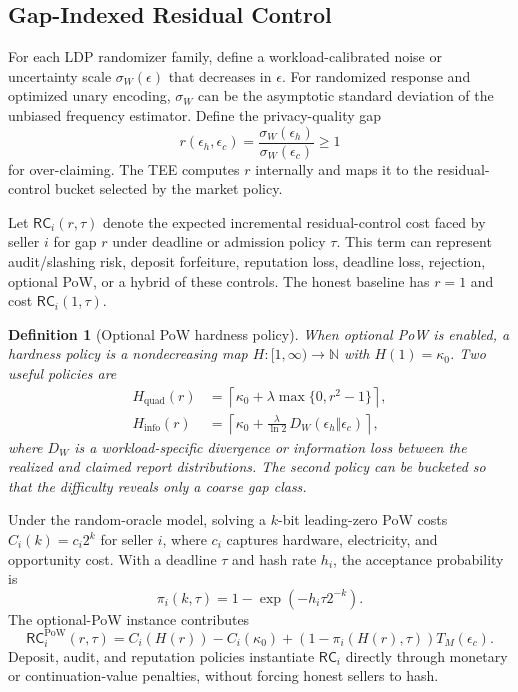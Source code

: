 \documentclass[conference]{IEEEtran}
\newtheorem{definition}{Definition}[section]
\newcommand{\eps}{\epsilon}
\newcommand{\pow}{\mathrm{PoW}}
\begin{document}
\subsection{Gap-Indexed Residual Control}

For each LDP randomizer family, define a workload-calibrated noise or uncertainty scale $\sigma_W(\eps)$ that decreases in $\eps$. For randomized response and optimized unary encoding, $\sigma_W$ can be the asymptotic standard deviation of the unbiased frequency estimator. Define the privacy-quality gap
\[
r(\eps_h,\eps_c)=\frac{\sigma_W(\eps_h)}{\sigma_W(\eps_c)}\ge 1
\]
for over-claiming. The TEE computes $r$ internally and maps it to the residual-control bucket selected by the market policy.

Let $\mathsf{RC}_i(r,\tau)$ denote the expected incremental residual-control cost faced by seller $i$ for gap $r$ under deadline or admission policy $\tau$. This term can represent audit/slashing risk, deposit forfeiture, reputation loss, deadline loss, rejection, optional PoW, or a hybrid of these controls. The honest baseline has $r=1$ and cost $\mathsf{RC}_i(1,\tau)$.

\begin{definition}[Optional PoW hardness policy]
\label{def:hardness}
When optional PoW is enabled, a hardness policy is a nondecreasing map $H:[1,\infty)\rightarrow\mathbb{N}$ with $H(1)=\kappa_0$. Two useful policies are
\begin{align*}
H_{\mathrm{quad}}(r)&=\left\lceil\kappa_0+\lambda\max\{0,r^2-1\}\right\rceil,\\
H_{\mathrm{info}}(r)&=\left\lceil\kappa_0+\frac{\lambda}{\ln 2}\,D_W(\eps_h\Vert\eps_c)\right\rceil,
\end{align*}
where $D_W$ is a workload-specific divergence or information loss between the realized and claimed report distributions. The second policy can be bucketed so that the difficulty reveals only a coarse gap class.
\end{definition}

Under the random-oracle model, solving a $k$-bit leading-zero PoW costs $C_i(k)=c_i2^k$ for seller $i$, where $c_i$ captures hardware, electricity, and opportunity cost. With a deadline $\tau$ and hash rate $h_i$, the acceptance probability is
\[
\pi_i(k,\tau)=1-\exp(-h_i\tau2^{-k}).
\]
The optional-PoW instance contributes
\[
\mathsf{RC}^{\pow}_i(r,\tau)=C_i(H(r))-C_i(\kappa_0)+(1-\pi_i(H(r),\tau))T_M(\eps_c).
\]
Deposit, audit, and reputation policies instantiate $\mathsf{RC}_i$ directly through monetary or continuation-value penalties, without forcing honest sellers to hash.
\end{document}
